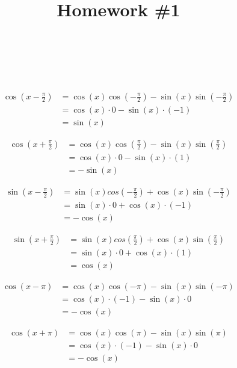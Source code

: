 \documentclass[12pt]{article} %
\title{
    \vspace{2in}
        \textmd{\textbf{\classTitle}}\\
    \vspace{1in}
    \textmd{\textbf{Homework \#1}}\\
    \vspace{1in}
}
\author{
    \hmwkAuthorName\\
    \hmwkStudentnum\\
}
\date{}
\newcommand*{\halfpi}{\frac{\pi}{2}}
\begin{document}
\maketitle

\pagebreak

\begin{homeworkProblem}
    \begin{align*}
        \cos{(x - \halfpi)}
         & = \cos(x)\cos(-\halfpi) - \sin(x)\sin(-\halfpi) \\
         & = \cos(x) \cdot 0 - \sin(x) \cdot (-1)          \\
         & = \sin(x)
    \end{align*}

    \begin{align*}
        \cos{(x + \frac{\pi}{2})}
         & = \cos(x)\cos(\halfpi) - \sin(x)\sin(\halfpi) \\
         & = \cos(x) \cdot 0 - \sin(x) \cdot (1)         \\
         & = - \sin(x)
    \end{align*}

    \begin{align*}
        \sin{(x - \halfpi)}
         & = \sin(x)cos(-\halfpi) + \cos(x)\sin(-\halfpi) \\
         & = \sin(x) \cdot 0 + \cos(x) \cdot (-1)         \\
         & = -\cos(x)
    \end{align*}

    \begin{align*}
        \sin{(x + \halfpi)}
         & = \sin(x)cos(\halfpi) + \cos(x)\sin(\halfpi) \\
         & = \sin(x) \cdot 0 + \cos(x) \cdot (1)        \\
         & = \cos(x)
    \end{align*}

    \begin{align*}
        \cos{(x - \pi)}
         & = \cos(x)\cos(-\pi) - \sin(x)\sin(-\pi) \\
         & = \cos(x) \cdot (-1) - \sin(x) \cdot 0  \\
         & = -\cos(x)
    \end{align*}

    \begin{align*}
        \cos{(x + \pi)}
         & = \cos(x)\cos(\pi) - \sin(x)\sin(\pi)  \\
         & = \cos(x) \cdot (-1) - \sin(x) \cdot 0 \\
         & = -\cos(x)
    \end{align*}


\end{homeworkProblem}
\end{document}

